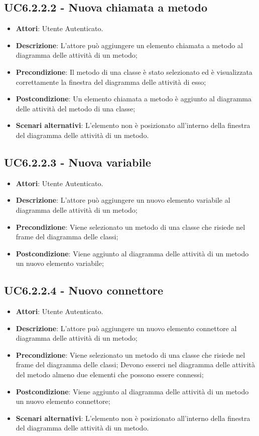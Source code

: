 \subsection{UC6.2.2.2 - Nuova chiamata a metodo} 
\label{ssec:UC6.2.2.2} 
\begin{itemize} 
\item \textbf{Attori}: Utente Autenticato.
\item \textbf{Descrizione}: L'attore può aggiungere un elemento chiamata a metodo al diagramma delle attività di un metodo;
\item \textbf{Precondizione}: Il metodo di una classe è stato selezionato ed è visualizzata correttamente la finestra del diagramma delle attività di esso;
\item \textbf{Postcondizione}: Un elemento chiamata a metodo è aggiunto al diagramma delle attività del metodo di una classe;
\item \textbf{Scenari alternativi}: L'elemento non è posizionato all'interno della finestra del diagramma delle attività di un metodo.
\end{itemize} 
\subsection{UC6.2.2.3 - Nuova variabile} 
\label{ssec:UC6.2.2.3} 
\begin{itemize} 
\item \textbf{Attori}: Utente Autenticato.
\item \textbf{Descrizione}: L'attore può aggiungere un nuovo elemento variabile al diagramma delle attività di un metodo;
\item \textbf{Precondizione}: Viene selezionato un metodo di una classe che risiede nel frame del diagramma delle  classi;
\item \textbf{Postcondizione}: Viene aggiunto al diagramma delle attività di un metodo un nuovo elemento variabile;
\end{itemize} 
\subsection{UC6.2.2.4 - Nuovo connettore} 
\label{ssec:UC6.2.2.4} 
\begin{itemize} 
\item \textbf{Attori}: Utente Autenticato.
\item \textbf{Descrizione}: L'attore può aggiungere un nuovo elemento connettore al diagramma delle attività di un metodo;
\item \textbf{Precondizione}: Viene selezionato un metodo di una classe che risiede nel frame del diagramma delle  classi; Devono esserci nel diagramma delle attività del metodo almeno due elementi che possono essere connessi;
\item \textbf{Postcondizione}: Viene aggiunto al diagramma delle attività di un metodo un nuovo elemento connettore;
\item \textbf{Scenari alternativi}: L'elemento non è posizionato all'interno della finestra del diagramma delle attività di un metodo.
\end{itemize} 
